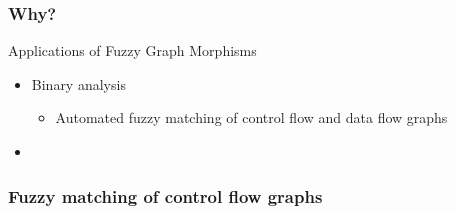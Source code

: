 


\begin{frame}
	\frametitle{Why?}

	\begin{block}{Applications of Fuzzy Graph Morphisms}
		\begin{itemize}
			\item Binary analysis
			\begin{itemize}
				\item Automated fuzzy matching of control flow and data flow graphs
			\end{itemize}
			\item {}
		\end{itemize}
	\end{block}
\end{frame}

\begin{frame}
	\frametitle{Fuzzy matching of control flow graphs}

\end{frame}
